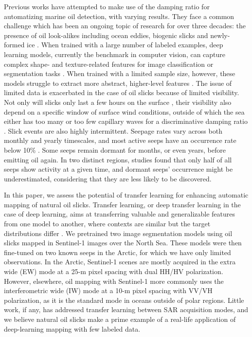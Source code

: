 \documentclass[lettersize,journal]{IEEEtran}
\begin{document}
Previous works have attempted to make use of the damping ratio for automatizing marine oil detection, with varying results. They face a common challenge which has been an ongoing topic of research for over three decades: 
the presence of oil look-alikes including ocean eddies, biogenic slicks and newly-formed ice \cite{johanssonCanMineralOil2020,hovlandSlickDetectionSAR1994,alpersOilsSurfactants2004,alpersOilSpillDetection2017}. 
When trained with a large number of labeled examples, deep learning models, currently the benchmark in computer vision, can capture complex shape- and texture-related features for image classification or segmentation tasks 
\cite{goodfellowDeepLearning2016}. When trained with a limited sample size, however, these models struggle to extract more abstract, higher-level features
\cite{bengioDeepLearningRepresentations2012}. The issue of limited data is exacerbated in the case of oil slicks because of limited visibility. Not only will slicks only last a few hours on the surface 
\cite{jatiaultMonitoringNaturalOil2017,daneshgaraslHindcastModelingOil2017,oreillyDistributionMagnitudeVariability2022}, their visibility also depend on a specific window of surface wind conditions, outside of which the sea 
either has too many or too few capillary waves for a discriminative damping ratio \cite{quigleyInvestigationDampingRatio2023,sausDetectionDelineationProduced2021,gadeImagingBiogenicAnthropogenic1998}. 
\IEEEpubidadjcol  
Slick events are also highly intermittent. Seepage rates vary across both monthly and yearly timescales, and most active seeps have an occurrence rate below 10\% 
\cite{jatiaultNaturalOilSeep2024,oreillyDistributionMagnitudeVariability2022}. Some seeps remain dormant for months, or even years, before emitting oil again. In two distinct regions, studies found that 
only half of all seeps show activity at a given time\cite{jatiaultMonitoringNaturalOil2017,garcia-pinedaRemotesensingEvaluationGeophysical2010}, and dormant seeps' occurrence might be underestimated, 
considering that they are less likely to be discovered.

In this paper, we assess the potential of transfer learning for enhancing automatic mapping of natural oil slicks. Transfer learning, or deep transfer learning in the case of deep learning, aims at 
transferring valuable and generalizable features from one model to another, where contexts are similar but the target distributions differ \cite{goodfellowDeepLearning2016}. 
We pretrained two image segmentation models using oil slicks mapped in Sentinel-1 images over the North Sea. These models were then fine-tuned on two known seeps in the Arctic, for which we have only 
limited observations. In the Arctic, Sentinel-1 scenes are mostly acquired in the extra wide (EW) mode at a 25-m pixel spacing with dual HH/HV polarization. However, elsewhere, oil mapping with Sentinel-1 more 
commonly uses the interferometric wide (IW) mode at a 10-m pixel spacing with VV/VH polarization, as it is the standard mode in oceans outside of polar regions.
Little work, if any, has addressed transfer learning between SAR acquisition modes, and we believe natural oil slicks make a prime example of a real-life application of deep-learning mapping with few labeled data. 
\end{document}
